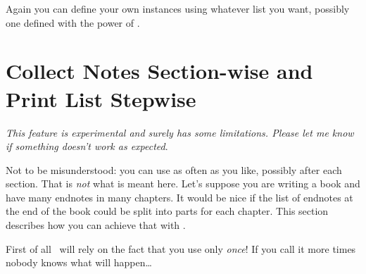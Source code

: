 \documentclass[load-preamble+]{cnltx-doc}
\begin{document}
Again you can define your own instances using whatever list you want, possibly
one defined with the power of .

\section{Collect Notes Section-wise and Print List Stepwise}\label{sec:split}
\emph{This feature is experimental and surely has some limitations.  Please
  let me know if something doesn't work as expected}.

Not to be misunderstood: you can use  as often as you like,
possibly after each section.  That is \emph{not} what is meant here.  Let's
suppose you are writing a book and have many endnotes in many chapters.  It
would be nice if the list of endnotes at the end of the book could be split
into parts for each chapter.  This section describes how you can achieve that
with \enotez.

First of all \enotez\ will rely on the fact that you use 
only \emph{once}!  If you call it more times nobody knows what will
happen\ldots
\end{document}
